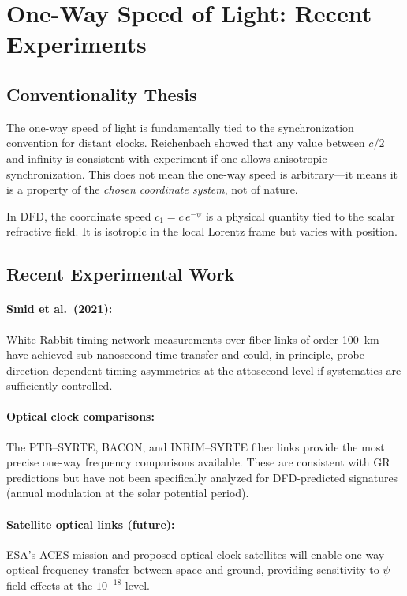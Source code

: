 \documentclass[12pt,letterpaper]{article}
\begin{document}
\section{One-Way Speed of Light: Recent Experiments}

\subsection{Conventionality Thesis}

The one-way speed of light is fundamentally tied to the synchronization
convention for distant clocks. Reichenbach showed that any value between
$c/2$ and infinity is consistent with experiment if one allows anisotropic
synchronization. This does not mean the one-way speed is arbitrary---it
means it is a property of the \emph{chosen coordinate system}, not of
nature.

In DFD, the coordinate speed $c_1 = c\,e^{-\psi}$ is a physical
quantity tied to the scalar refractive field. It is isotropic in the
local Lorentz frame but varies with position.

\subsection{Recent Experimental Work}

\paragraph{Smid et al.\ (2021):}
White Rabbit timing network measurements over fiber links of order 100~km
have achieved sub-nanosecond time transfer and could, in principle, probe
direction-dependent timing asymmetries at the attosecond level if
systematics are sufficiently controlled.

\paragraph{Optical clock comparisons:}
The PTB--SYRTE, BACON, and INRIM--SYRTE fiber links provide the most
precise one-way frequency comparisons available. These are consistent
with GR predictions but have not been specifically analyzed for
DFD-predicted signatures (annual modulation at the solar potential
period).

\paragraph{Satellite optical links (future):}
ESA's ACES mission and proposed optical clock satellites will enable
one-way optical frequency transfer between space and ground, providing
sensitivity to $\psi$-field effects at the $10^{-18}$ level.
\end{document}
